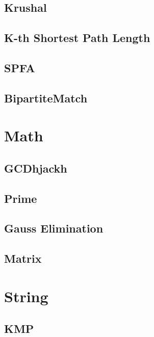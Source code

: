     \subsection{Krushal}
        
    \subsection{K-th Shortest Path Length}
        
    \subsection{SPFA}
        
    \subsection{BipartiteMatch}
        

\section{Math}
    \subsection{GCDhjackh}
        
    \subsection{Prime}
        
    \subsection{Gauss Elimination}
        
    \subsection{Matrix}
        
        
\section{String}
    \subsection{KMP}
        
